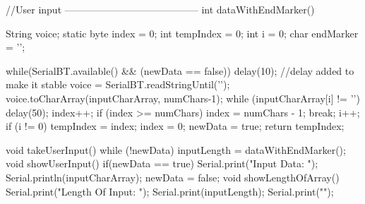 //User input -----------------------------------------
int dataWithEndMarker(){
  String voice;
  static byte index = 0;
  int tempIndex = 0;
  int i = 0;
  char endMarker = '\n';
  
  while(SerialBT.available() && (newData == false)){
    delay(10);    //delay added to make it stable
    voice = SerialBT.readStringUntil('\n');
    voice.toCharArray(inputCharArray, numChars-1);
    while (inputCharArray[i] != '\0'){
      delay(50);
      index++;
      if (index >= numChars){
        index = numChars - 1;
        break;
      }
      i++;
    }
    if (i != 0){
      tempIndex = index;
      index = 0;
      newData = true;
      return tempIndex;
    }
  }
}
void takeUserInput(){
  while (!newData)
  {inputLength = dataWithEndMarker(); }
}
void showUserInput(){
  if(newData == true){
    Serial.print("\n Input Data:  ");
    Serial.println(inputCharArray);
    newData = false;
  }
}
void  showLengthOfArray(){
    Serial.print("Length Of Input: "); 
    Serial.print(inputLength); 
    Serial.print("\n\n");
}

